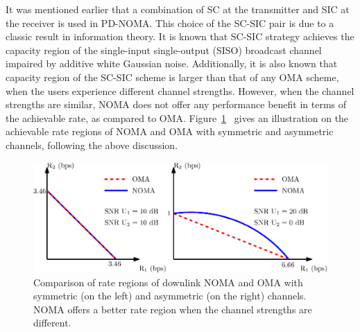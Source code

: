 \begin{multicols}{2}
It was mentioned earlier that a combination of SC at the transmitter and SIC at the receiver is used in PD-NOMA. This choice of the SC-SIC pair is due to a classic result in information theory. It is known that SC-SIC strategy achieves the capacity region of the single-input single-output (SISO) broadcast channel impaired by additive white Gaussian noise. Additionally, it is also known that capacity region of the SC-SIC scheme is larger than that of any OMA scheme, when the users experience different channel strengths. However, when the channel strengths are similar, NOMA does not offer any performance benefit in terms of the achievable rate, as compared to OMA. Figure~\ref{Fig-RR}~ gives an illustration on the achievable rate regions of NOMA and OMA with symmetric and asymmetric channels, following the above discussion.
\begin{figure}[H]
 \centering
  \includegraphics[scale=0.63]{src/Figures/chap5/RateRegions.eps}
  \caption{Comparison of rate regions of downlink NOMA and OMA with symmetric (on the left) and asymmetric (on the right) channels. NOMA offers a better rate region when the channel strengths are different.} \label{Fig-RR}
\end{figure}


\end{multicols}
